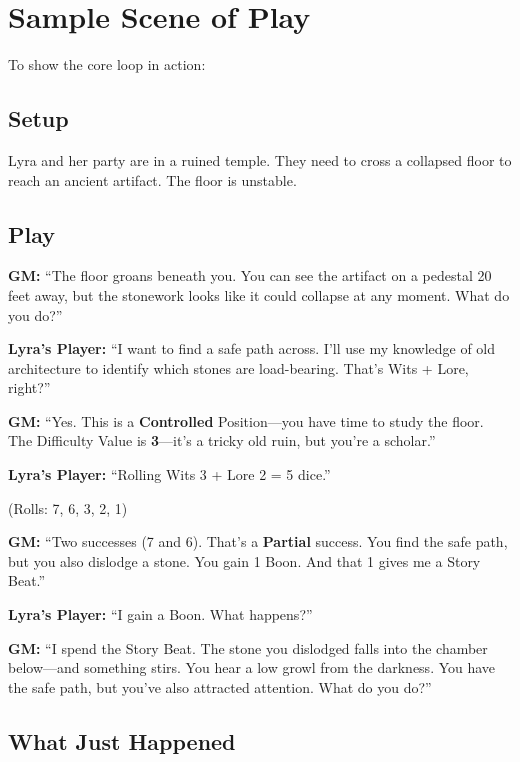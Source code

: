 \documentclass[10pt]{article}
\begin{document}
\newpage

\section*{Sample Scene of Play}

To show the core loop in action:

\subsection*{Setup}

Lyra and her party are in a ruined temple. They need to cross a collapsed floor to reach an ancient artifact. The floor is unstable.

\subsection*{Play}

\textbf{GM:} ``The floor groans beneath you. You can see the artifact on a pedestal 20 feet away, but the stonework looks like it could collapse at any moment. What do you do?''

\textbf{Lyra's Player:} ``I want to find a safe path across. I'll use my knowledge of old architecture to identify which stones are load-bearing. That's Wits + Lore, right?''

\textbf{GM:} ``Yes. This is a \textbf{Controlled} Position---you have time to study the floor. The Difficulty Value is \textbf{3}---it's a tricky old ruin, but you're a scholar.''

\textbf{Lyra's Player:} ``Rolling Wits 3 + Lore 2 = 5 dice.''

\noindent
(Rolls: 7, 6, 3, 2, 1)

\textbf{GM:} ``Two successes (7 and 6). That's a \textbf{Partial} success. You find the safe path, but you also dislodge a stone. You gain 1 Boon. And that 1 gives me a Story Beat.''

\textbf{Lyra's Player:} ``I gain a Boon. What happens?''

\textbf{GM:} ``I spend the Story Beat. The stone you dislodged falls into the chamber below---and something stirs. You hear a low growl from the darkness. You have the safe path, but you've also attracted attention. What do you do?''

\subsection*{What Just Happened}
\end{document}
